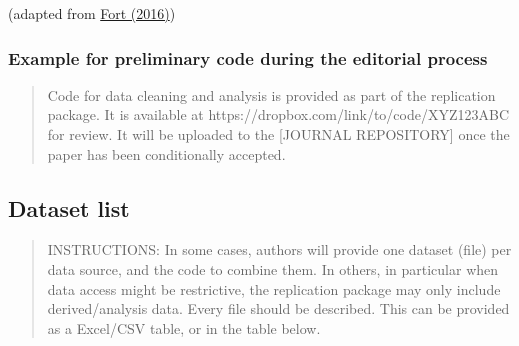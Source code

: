 \documentclass[
]{article}
\begin{document}
(adapted from \href{https://doi.org/10.1093/restud/rdw057}{Fort (2016)})

\hypertarget{example-for-preliminary-code-during-the-editorial-process}{%
\subsubsection{Example for preliminary code during the editorial
process}\label{example-for-preliminary-code-during-the-editorial-process}}

\begin{quote}
Code for data cleaning and analysis is provided as part of the
replication package. It is available at
https://dropbox.com/link/to/code/XYZ123ABC for review. It will be
uploaded to the {[}JOURNAL REPOSITORY{]} once the paper has been
conditionally accepted.
\end{quote}

\hypertarget{dataset-list}{%
\subsection{Dataset list}\label{dataset-list}}

\begin{quote}
INSTRUCTIONS: In some cases, authors will provide one dataset (file) per
data source, and the code to combine them. In others, in particular when
data access might be restrictive, the replication package may only
include derived/analysis data. Every file should be described. This can
be provided as a Excel/CSV table, or in the table below.
\end{quote}
\end{document}
